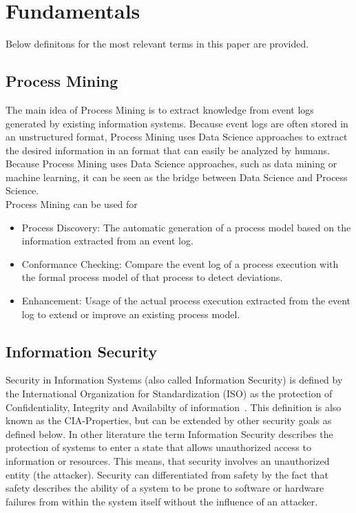 \documentclass[runningheads]{llncs}
\begin{document}
\section{Fundamentals}\label{Fundamentals}
Below definitons for the most relevant terms in this paper are provided.
\subsection{Process Mining}\label{Process Mining}
The main idea of Process Mining is to extract knowledge from event logs generated by existing information systems. Because event logs are often stored in an unstructured format, Process Mining uses Data Science approaches to
extract the desired information in an format that can easily be analyzed by humans.\cite{vanderAalst2016} Because Process Mining uses Data Science approaches, such as data mining or machine learning, it can be seen as the bridge between Data Science and Process Science.\\
Process Mining can be used for
\begin{itemize}
    \item Process Discovery: The automatic generation of a process model based on the information extracted from an event log.
    \item Conformance Checking: Compare the event log of a process execution with the formal process model of that process to detect deviations.
    \item Enhancement: Usage of the actual process execution extracted from the event log to extend or improve an existing process model.
\end{itemize}

\subsection{Information Security}\label{Security}
Security in Information Systems (also called Information Security) is defined by the International Organization for Standardization (ISO) as the protection of
Confidentiality, Integrity and Availabilty of information~\cite{ISO}. This definition is also known as the CIA-Properties, but can be extended by other security goals as defined below. In other
literature the term Information Security describes the protection of systems to enter a state that allows unauthorized access to information or resources. This means, that security involves an
unauthorized entity (the attacker). Security can differentiated from safety by the fact that safety describes the ability of a system to be prone to software or hardware failures from within
the system itself without the influence of an attacker.\cite{Eckert}\\
\end{document}
